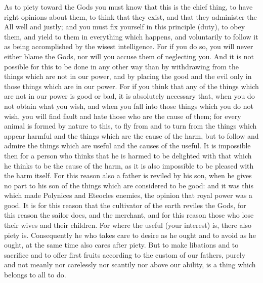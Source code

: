 As to piety toward the Gods you must know that this is the chief thing, to have
right opinions about  them, to think that they exist,  and that they administer
the All well and justly; and you must fix yourself in this principle (duty), to
obey them,  and yield to them  in everything which happens,  and voluntarily to
follow it as being  accomplished by the wisest intelligence. For  if you do so,
you will never  either blame the Gods,  nor will you accuse  them of neglecting
you. And  it is  not possible  for this  to be done  in any  other way  than by
withdrawing from the things which are not in our power, and by placing the good
and the evil only in those things which are in our power. For if you think that
any of the things  which are not in our power is good  or bad, it is absolutely
necessary that, when  you do not obtain  what you wish, and when  you fall into
those things which you do not wish, you  will find fault and hate those who are
the cause of  them; for every animal is  formed by nature to this,  to fly from
and to turn from  the things which appear harmful and the  things which are the
cause of the harm, but to follow and admire the things which are useful and the
causes of the useful. It is impossible then  for a person who thinks that he is
harmed to be delighted  with that which he thinks to be the  cause of the harm,
as it is  also impossible to be  pleased with the harm itself.  For this reason
also a father  is reviled by his son, when  he gives no part to his  son of the
things which are  considered to be good:  and it was this  which made Polynices
and Eteocles enemies, the  opinion that royal power was a good.  It is for this
reason that the cultivator  of the earth reviles the Gods,  for this reason the
sailor does, and the  merchant, and for this reason those  who lose their wives
and their children.  For where the useful (your interest)  is, there also piety
is. Consequently  he who takes care  to desire as he  ought and to avoid  as he
ought, at the  same time also cares  after piety. But to make  libations and to
sacrifice and  to offer first  fruits according to  the custom of  our fathers,
purely and not meanly  nor carelessly nor scantily nor above  our ability, is a
thing which belongs to all to do.
